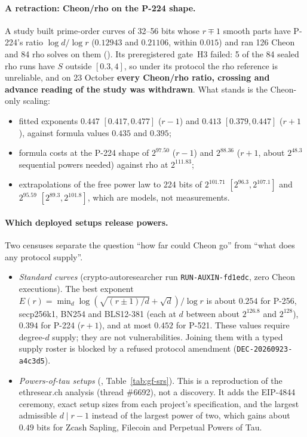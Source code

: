 \paragraph{A retraction: Cheon/rho on the P-224 shape.} A study built
prime-order curves of 32--56 bits whose $r\mp1$ smooth parts have P-224's
ratio $\log d/\log r$ ($0.12943$ and $0.21106$, within $0.015$) and ran
126 Cheon and 84 rho solves on them
(). Its preregistered
gate~H3 failed: 5 of the 84 sealed rho runs have $S$ outside $[0.3,4]$, so
under its protocol the rho reference is unreliable, and on 23 October
\textbf{every Cheon/rho ratio, crossing and advance reading of the study
was withdrawn}. What stands is the Cheon-only scaling:
\begin{itemize}
\item fitted exponents $0.447$ $[0.417,0.477]$ ($r-1$) and $0.413$
  $[0.379,0.447]$ ($r+1$), against formula values $0.435$ and $0.395$;
\item formula costs at the P-224 shape of $2^{97.50}$ ($r-1$) and
  $2^{88.36}$ ($r+1$, about $2^{48.3}$ sequential powers needed) against
  rho at $2^{111.83}$;
\item extrapolations of the free power law to 224 bits of $2^{101.71}$
  $[2^{96.3},2^{107.1}]$ and $2^{95.59}$ $[2^{89.3},2^{101.8}]$, which are
  models, not measurements.
\end{itemize}

\paragraph{Which deployed setups release powers.} Two censuses separate the
question ``how far could Cheon go'' from ``what does any protocol supply''.
\begin{itemize}
\item \emph{Standard curves} (crypto-autoresearcher run
  \texttt{RUN-AUXIN-fd1edc}, zero Cheon executions). The best exponent
  $E(r)=\min_d\log(\sqrt{(r\pm1)/d}+\sqrt d)/\log r$ is about $0.254$ for
  P-256, secp256k1, BN254 and BLS12-381 (each at $d$ between about
  $2^{126.8}$ and $2^{128}$),
  $0.394$ for P-224 ($r+1$), and at most $0.452$ for P-521. These values
  require degree-$d$ supply; they are not vulnerabilities. Joining them with
  a typed supply roster is blocked by a refused protocol amendment
  (\texttt{DEC-20260923-a4c3d5}).
\item \emph{Powers-of-tau setups} (,
  Table~\ref{tab:gf-srs}). This is a reproduction of the ethresear.ch
  analysis (thread \#6692), not a discovery. It adds the EIP-4844 ceremony,
  exact setup sizes from each project's specification, and the largest
  admissible $d\mid r-1$ instead of the largest power of two, which gains
  about $0.49$ bits for Zcash Sapling, Filecoin and Perpetual Powers of Tau.
\end{itemize}

